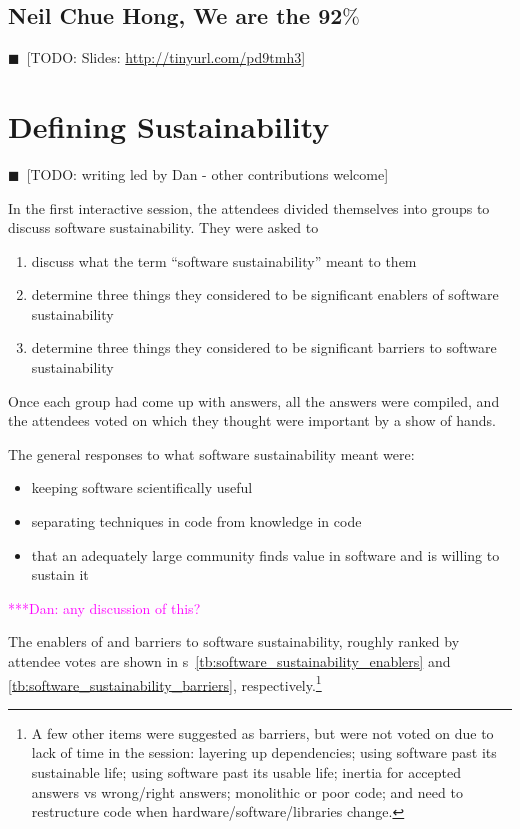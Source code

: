 \documentclass[11pt, oneside]{amsart}
\newcommand{\todo}[1]{{\color{blue}$\blacksquare$~\textsf{[TODO: #1]}}}
\newcommand{\katznote}[1]{ {\textcolor{magenta}    { ***Dan:      #1 }}}
\begin{document}
\subsection{Neil Chue Hong, We are the 92$\%$} 
\label{keynote2}

\todo{Slides: \url{http://tinyurl.com/pd9tmh3}}

\section{Defining Sustainability} \label{sec:defining}

\todo{writing led by Dan - other contributions welcome}

In the first interactive session, the attendees divided themselves into groups
to discuss software sustainability. They were asked to
\begin{enumerate}
\item discuss what the term ``software sustainability'' meant to them

\item determine three things they considered to be significant enablers of
software sustainability

\item determine three things they considered to be significant barriers to
software sustainability
\end{enumerate}
Once each group had come up with answers, all the answers were compiled, and the
attendees voted on which they thought were important by a show of hands.

The general responses to what software sustainability meant were:
\begin{itemize}
\item keeping software scientifically useful
\item separating techniques in code from knowledge in code
\item that an adequately large community finds value in software and is willing
to sustain it
\end{itemize}

\katznote{any discussion of this?}

The enablers of and barriers to software sustainability, roughly ranked by
attendee votes are shown in
{\tablename}s~\ref{tb:software_sustainability_enablers} and
\ref{tb:software_sustainability_barriers}, respectively.\footnote{A few other
items were suggested as barriers, but were not voted on due to lack of time in
the session:
layering up dependencies;
using software past its sustainable life;
using software past its usable life;
inertia for accepted answers vs wrong/right answers;
monolithic or poor code; and
need to restructure code when hardware/software/libraries change.
}
\end{document}
